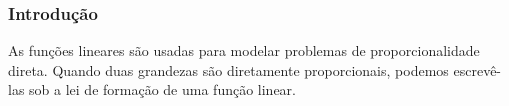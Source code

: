 \subsubsection{Introdução}

As funções lineares são usadas para modelar problemas de
proporcionalidade direta. Quando duas grandezas são
diretamente proporcionais, podemos escrevê-las sob a lei de
formação de uma função linear.
